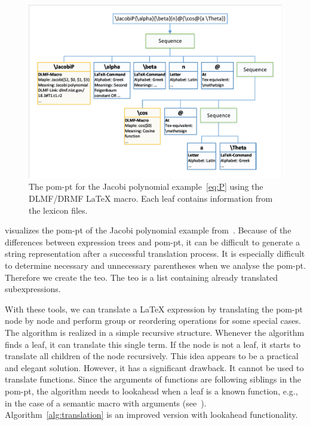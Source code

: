 \documentclass[a4paper,11pt]{article}
\theoremstyle{defTheoStyle}
\theoremstyle{defExampStyle}
\begin{document}
\begin{figure}[ht]
	\centering
	\includegraphics[clip, trim=0.2cm 0.2cm 0.2cm 0.2cm, scale=0.75]{SyntaxTreeUseCase.pdf}
	\caption{The \gls*{pom-pt} for the Jacobi polynomial example~\eqref{eq:P} using the DLMF/DRMF \LaTeX{} macro. Each leaf contains information from the lexicon files.}
	\label{fig:syntax-tree-usecase}
	\vspace{-10pt}
\end{figure}

 visualizes the \gls*{pom-pt} of the Jacobi polynomial example from~. Because of the differences between expression trees and \gls*{pom-pt}, it can be difficult to generate a string representation after a successful translation process. It is especially difficult to determine necessary and unnecessary parentheses when we analyse the \gls*{pom-pt}. Therefore we create the \gls*{teo}. The \gls*{teo} is a list containing already translated subexpressions.

With these tools, we can translate a \LaTeX{} expression by translating the \gls*{pom-pt} node by node and perform group or reordering operations for some special cases. The algorithm is realized in a simple recursive structure. Whenever the algorithm finds a leaf, it can translate this single term. If the node is not a leaf, it starts to translate all children of the node recursively. This idea appears to be a practical and elegant solution. However, it has a significant drawback. It cannot be used to translate functions. Since the arguments of functions are following siblings in the \gls*{pom-pt}, the algorithm needs to lookahead when a leaf is a known function, e.g., in the case of a semantic macro with arguments (see~). Algorithm~\ref{alg:translation} is an improved version with lookahead functionality.
\end{document}
